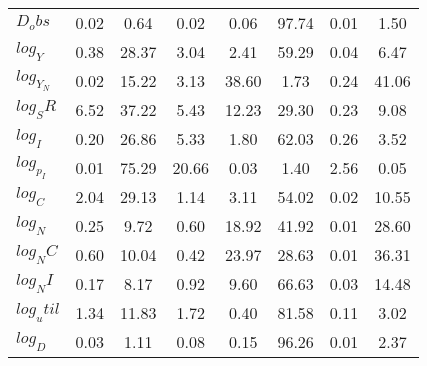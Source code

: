 \begin{center}
\begin{longtable}{lccccccc}
$D_obs     $	 & 	        0.02	 & 	        0.64	 & 	        0.02	 & 	        0.06	 & 	       97.74	 & 	        0.01	 & 	        1.50 \\ 
$log_Y     $	 & 	        0.38	 & 	       28.37	 & 	        3.04	 & 	        2.41	 & 	       59.29	 & 	        0.04	 & 	        6.47 \\ 
$log_Y_N   $	 & 	        0.02	 & 	       15.22	 & 	        3.13	 & 	       38.60	 & 	        1.73	 & 	        0.24	 & 	       41.06 \\ 
$log_SR    $	 & 	        6.52	 & 	       37.22	 & 	        5.43	 & 	       12.23	 & 	       29.30	 & 	        0.23	 & 	        9.08 \\ 
$log_I     $	 & 	        0.20	 & 	       26.86	 & 	        5.33	 & 	        1.80	 & 	       62.03	 & 	        0.26	 & 	        3.52 \\ 
$log_p_I   $	 & 	        0.01	 & 	       75.29	 & 	       20.66	 & 	        0.03	 & 	        1.40	 & 	        2.56	 & 	        0.05 \\ 
$log_C     $	 & 	        2.04	 & 	       29.13	 & 	        1.14	 & 	        3.11	 & 	       54.02	 & 	        0.02	 & 	       10.55 \\ 
$log_N     $	 & 	        0.25	 & 	        9.72	 & 	        0.60	 & 	       18.92	 & 	       41.92	 & 	        0.01	 & 	       28.60 \\ 
$log_NC    $	 & 	        0.60	 & 	       10.04	 & 	        0.42	 & 	       23.97	 & 	       28.63	 & 	        0.01	 & 	       36.31 \\ 
$log_NI    $	 & 	        0.17	 & 	        8.17	 & 	        0.92	 & 	        9.60	 & 	       66.63	 & 	        0.03	 & 	       14.48 \\ 
$log_util  $	 & 	        1.34	 & 	       11.83	 & 	        1.72	 & 	        0.40	 & 	       81.58	 & 	        0.11	 & 	        3.02 \\ 
$log_D     $	 & 	        0.03	 & 	        1.11	 & 	        0.08	 & 	        0.15	 & 	       96.26	 & 	        0.01	 & 	        2.37 \\ 
\end{longtable}
 \end{center}
